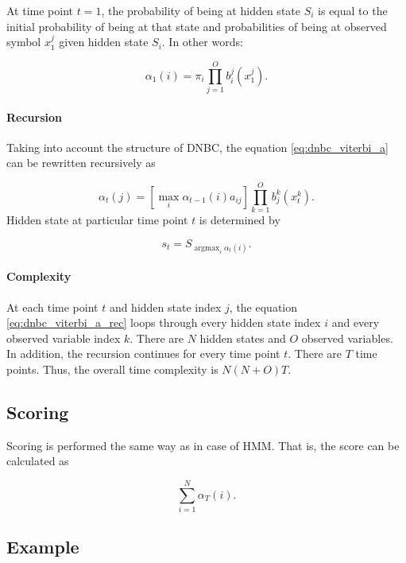 \documentclass[thesis=B,english]{FITthesis}[2012/06/26]
\DeclareMathOperator*{\argmax}{argmax} %
\begin{document}
At time point $t=1$, the probability of being at hidden state $S_i$ is equal to the initial probability of being at that state and probabilities of being at observed symbol $x_1^j$ given hidden state $S_i$. In other words:

\begin{equation*}
\alpha_1(i) = \pi_i \prod_{j=1}^O b^j_i(x^j_1).
\end{equation*}

\paragraph{Recursion}
Taking into account the structure of DNBC, the equation \ref{eq:dnbc_viterbi_a} can be rewritten recursively as

\begin{equation} \label{eq:dnbc_viterbi_a_rec}
\alpha_t(j) = [\max_i \alpha_{t-1}(i)a_{ij}] \prod_{k=1}^O b_j^k(x^k_t).
\end{equation}
Hidden state at particular time point $t$ is determined by

\begin{equation*}
s_t = S_{\argmax_i \alpha_{t}(i)}.
\end{equation*}

\paragraph{Complexity}

At each time point $t$ and hidden state index $j$, the equation \ref{eq:dnbc_viterbi_a_rec} loops through every hidden state index $i$ and every observed variable index $k$. There are $N$ hidden states and $O$ observed variables. In addition, the recursion continues for every time point $t$. There are $T$ time points. Thus, the overall time complexity is
$N(N+O) T$.

\subsection{Scoring}

Scoring is performed the same way as in case of HMM. That is, the score can be calculated as

\begin{equation*}
\sum_{i=1}^{N} \alpha_T(i).
\end{equation*}

\subsection{Example}
\end{document}
